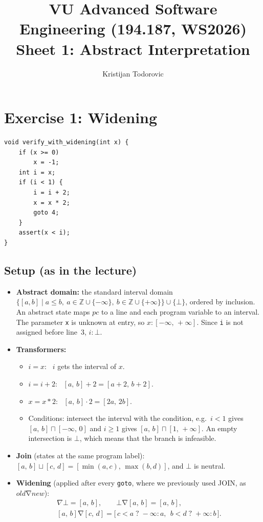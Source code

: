 \documentclass[11pt,a4paper]{article}
\title{VU Advanced Software Engineering (194.187, WS2026)\\
       Sheet 1: Abstract Interpretation}
\author{Kristijan Todorovic}
\date{}
\newcommand{\itv}[2]{[#1,\,#2]}
\newcommand{\ninf}{-\infty}
\newcommand{\pinf}{+\infty}
\begin{document}
\maketitle

\section*{Exercise 1: Widening}

\begin{lstlisting}
void verify_with_widening(int x) {
    if (x >= 0)
        x = -1;
    int i = x;
    if (i < 1) {
        i = i + 2;
        x = x * 2;
        goto 4;
    }
    assert(x < i);
}
\end{lstlisting}

\subsection*{Setup (as in the lecture)}

\begin{itemize}
  \item \textbf{Abstract domain:} the standard interval domain
        $\{[a,b] \mid a \le b,\ a \in \mathbb{Z}\cup\{\ninf\},\ b \in \mathbb{Z}\cup\{\pinf\}\} \cup \{\bot\}$,
        ordered by inclusion. An abstract state maps $\mathit{pc}$ to a line and each program
        variable to an interval. The parameter \texttt{x} is unknown at entry, so
        $x\colon\itv{\ninf}{\pinf}$. Since \texttt{i} is not assigned before line~3, $i\colon\bot$.
  \item \textbf{Transformers:}
        \begin{itemize}
          \item $i = x$: \ $i$ gets the interval of $x$.
          \item $i = i + 2$: \ $\itv{a}{b} + 2 = \itv{a+2}{b+2}$.
          \item $x = x * 2$: \ $\itv{a}{b} \cdot 2 = \itv{2a}{2b}$.
          \item Conditions: intersect the interval with the condition, e.g.\
                $i < 1$ gives $\itv{a}{b} \sqcap \itv{\ninf}{0}$ and
                $i \ge 1$ gives $\itv{a}{b} \sqcap \itv{1}{\pinf}$.
                An empty intersection is $\bot$, which means that the branch is infeasible.
        \end{itemize}
  \item \textbf{Join} (states at the same program label):
        $\itv{a}{b} \sqcup \itv{c}{d} = \itv{\min(a,c)}{\max(b,d)}$, and $\bot$ is neutral.
  \item \textbf{Widening} (applied after every \texttt{goto}, where we previously used JOIN, as $\mathit{old} \mathbin{\nabla} \mathit{new}$):
        \begin{gather*}
          \itv{a}{b} \mathbin{\nabla} \bot = \itv{a}{b}, \qquad
          \bot \mathbin{\nabla} \itv{a}{b} = \itv{a}{b}, \\
          \itv{a}{b} \mathbin{\nabla} \itv{c}{d} =
          \big[\, c < a \;?\; \ninf : a,\ \ b < d \;?\; \pinf : b \,\big].
        \end{gather*}
\end{itemize}
\end{document}
